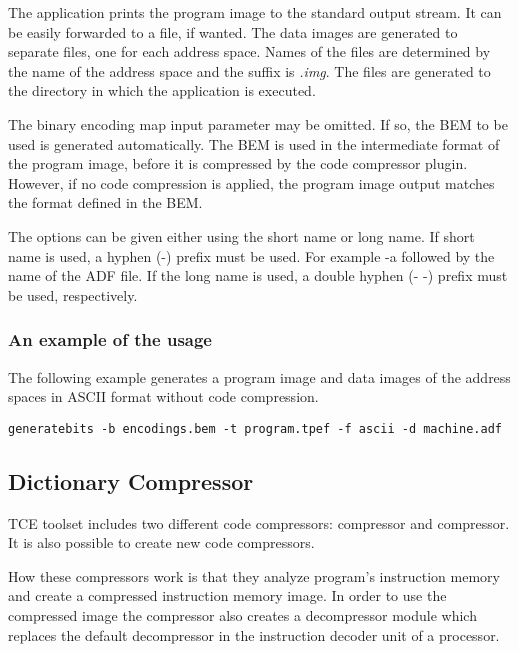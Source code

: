 \documentclass[twoside]{tceusermanual}
\begin{document}
The application prints the program image to the standard output
stream. It can be easily forwarded to a file, if wanted. The data
images are generated to separate files, one for each address
space. Names of the files are determined by the name of the address
space and the suffix is \emph{.img}. The files are generated to 
the directory in which the application is executed.

The binary encoding map input parameter may be omitted. If so, the BEM
to be used is generated automatically. The BEM is used in the
intermediate format of the program image, before it is compressed by
the code compressor plugin. However, if no code compression is
applied, the program image output matches the format defined in the
BEM.

The options can be given either using the short name or long name. If
short name is used, a hyphen (-) prefix must be used. For example -a
followed by the name of the ADF file. If the long name is used, a
double hyphen (- -) prefix must be used, respectively.

\subsubsection{An example of the usage}

The following example generates a program image and data images of the address
spaces in ASCII format without code compression.

\begin{verbatim}
generatebits -b encodings.bem -t program.tpef -f ascii -d machine.adf
\end{verbatim}

\subsection{Dictionary Compressor}

TCE toolset includes two different code compressors: 
compressor and  compressor. It is also possible to
create new code compressors.

How these compressors work is that they analyze program's instruction memory and
create a compressed instruction memory image. In order to use the compressed
image the compressor also creates a decompressor module which replaces the
default decompressor in the instruction decoder unit of a processor.
\end{document}
